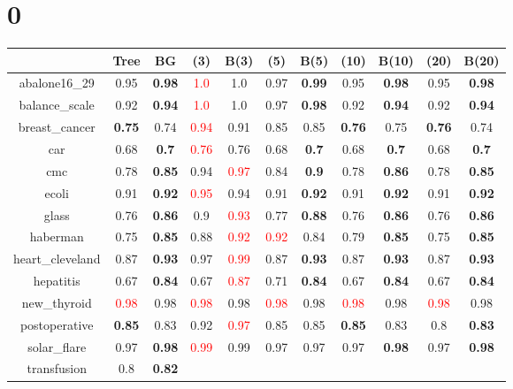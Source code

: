 \documentclass{article}%
\begin{document}
%
\normalsize%
\section*{0}%
\begin{tabular}{c|cccccccccc}%
\hline%
&Tree&BG&(3)&B(3)&(5)&B(5)&(10)&B(10)&(20)&B(20)\\%
\hline%
abalone16\_29&0.95&\textbf{0.98}&\textcolor{red}{ 
1.0
}&1.0&0.97&\textbf{0.99}&0.95&\textbf{0.98}&0.95&\textbf{0.98}\\%
\hline%
balance\_scale&0.92&\textbf{0.94}&\textcolor{red}{ 
1.0
}&1.0&0.97&\textbf{0.98}&0.92&\textbf{0.94}&0.92&\textbf{0.94}\\%
\hline%
breast\_cancer&\textbf{0.75}&0.74&\textcolor{red}{ 
0.94
}&0.91&0.85&0.85&\textbf{0.76}&0.75&\textbf{0.76}&0.74\\%
\hline%
car&0.68&\textbf{0.7}&\textcolor{red}{ 
0.76
}&0.76&0.68&\textbf{0.7}&0.68&\textbf{0.7}&0.68&\textbf{0.7}\\%
\hline%
cmc&0.78&\textbf{0.85}&0.94&\textcolor{red}{ 
0.97
}&0.84&\textbf{0.9}&0.78&\textbf{0.86}&0.78&\textbf{0.85}\\%
\hline%
ecoli&0.91&\textbf{0.92}&\textcolor{red}{ 
0.95
}&0.94&0.91&\textbf{0.92}&0.91&\textbf{0.92}&0.91&\textbf{0.92}\\%
\hline%
glass&0.76&\textbf{0.86}&0.9&\textcolor{red}{ 
0.93
}&0.77&\textbf{0.88}&0.76&\textbf{0.86}&0.76&\textbf{0.86}\\%
\hline%
haberman&0.75&\textbf{0.85}&0.88&\textcolor{red}{ 
0.92
}&\textcolor{red}{ 
0.92
}&0.84&0.79&\textbf{0.85}&0.75&\textbf{0.85}\\%
\hline%
heart\_cleveland&0.87&\textbf{0.93}&0.97&\textcolor{red}{ 
0.99
}&0.87&\textbf{0.93}&0.87&\textbf{0.93}&0.87&\textbf{0.93}\\%
\hline%
hepatitis&0.67&\textbf{0.84}&0.67&\textcolor{red}{ 
0.87
}&0.71&\textbf{0.84}&0.67&\textbf{0.84}&0.67&\textbf{0.84}\\%
\hline%
new\_thyroid&\textcolor{red}{ 
0.98
}&0.98&\textcolor{red}{ 
0.98
}&0.98&\textcolor{red}{ 
0.98
}&0.98&\textcolor{red}{ 
0.98
}&0.98&\textcolor{red}{ 
0.98
}&0.98\\%
\hline%
postoperative&\textbf{0.85}&0.83&0.92&\textcolor{red}{ 
0.97
}&0.85&0.85&\textbf{0.85}&0.83&0.8&\textbf{0.83}\\%
\hline%
solar\_flare&0.97&\textbf{0.98}&\textcolor{red}{ 
0.99
}&0.99&0.97&0.97&0.97&\textbf{0.98}&0.97&\textbf{0.98}\\%
\hline%
transfusion&0.8&\textbf{0.82}&\textcolor{red}{ 
}
\end{tabular}
\end{document}
